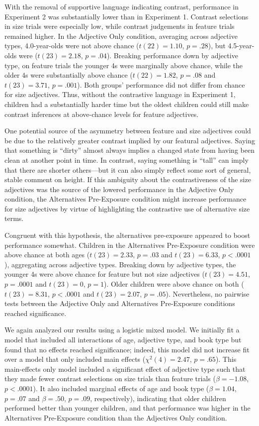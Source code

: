 \documentclass[man]{apa2}
\begin{document}
With the removal of supportive language indicating contrast, performance in Experiment 2 was substantially lower than in Experiment 1. Contrast selections in size trials were especially low, while contrast judgements in feature trials remained higher. In the Adjective Only condition, averaging across adjective types, 4.0-year-olds were not above chance ($t(22) = 1.10$, $p = .28$), but 4.5-year-olds were ($t(23)=2.18$, $p = .04$). Breaking performance down by adjective type, on feature trials the younger 4s were marginally above chance, while the older 4s were substantially above chance ($t(22) = 1.82$, $p = .08$ and $t(23)=3.71$, $p = .001$). Both groups' performance did not differ from chance for size adjectives. Thus, without the contrastive language in Experiment 1, children had a substantially harder time but the oldest children could still make contrast inferences at above-chance levels for feature adjectives. 

One potential source of the asymmetry between feature and size adjectives could be due to the relatively greater contrast implied by our featural adjectives. Saying that something is ``dirty'' almost always implies a changed state from having been clean at another point in time. In contrast, saying something is ``tall'' can imply that there are shorter others---but it can also simply reflect some sort of general, stable comment on height. If this ambiguity about the contrastiveness of the size adjectives was the source of the lowered performance in the Adjective Only condition, the Alternatives Pre-Exposure condition might increase performance for size adjectives by virtue of highlighting the contrastive use of alternative size terms. 

Congruent with this hypothesis, the alternatives pre-exposure appeared to boost performance somewhat. Children in the Alternatives Pre-Exposure condition were above chance at both ages ($t(23) = 2.33$, $p = .03$ and $t(23) = 6.33$, $p < .0001$), aggregating across adjective types. Breaking down by adjective types, the younger 4s were above chance for feature but not size adjectives ($t(23) = 4.51$, $p = .0001$ and $t(23)=0$, $p = 1$). Older children were above chance on both ($t(23) = 8.31$, $p < .0001$ and $t(23)= 2.07$, $p = .05$). Nevertheless, no pairwise tests between the Adjective Only and Alternatives Pre-Exposure conditions reached significance. 

We again analyzed our results using a logistic mixed model. We initially fit a model that included all interactions of age, adjective type, and book type but found that no effects reached significance; indeed, this model did not increase fit over a model that only included main effects ($\chi^2(4) = 2.47$, $p = .65$). This main-effects only model included a significant effect of adjective type such that they made fewer contrast selections on size trials than feature trials ($\beta = -1.08$, $p < .0001$). It also included marginal effects of age and book type ($\beta = 1.04$, $p = .07$ and $\beta = .50$, $p = .09$, respectively), indicating that older children performed better than younger children, and that performance was higher in the Alternatives Pre-Exposure condition than the Adjectives Only condition. 
\end{document}
